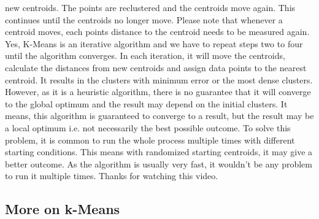 new centroids. The points are reclustered and the centroids move again. This continues until the centroids no longer move. Please note that whenever a centroid moves, each points distance to the centroid needs to be measured again. Yes, K-Means is an iterative algorithm and we have to repeat steps two to four until the algorithm converges. In each iteration, it will move the centroids, calculate the distances from new centroids and assign data points to the nearest centroid. It results in the clusters with minimum error or the most dense clusters. However, as it is a heuristic algorithm, there is no guarantee that it will converge to the global optimum and the result may depend on the initial clusters. It means, this algorithm is guaranteed to converge to a result, but the result may be a local optimum i.e. not necessarily the best possible outcome. To solve this problem, it is common to run the whole process multiple times with different starting conditions. This means with randomized starting centroids, it may give a better outcome. As the algorithm is usually very fast, it wouldn't be any problem to run it multiple times. Thanks for watching this video.

\subsection{More on k-Means}

